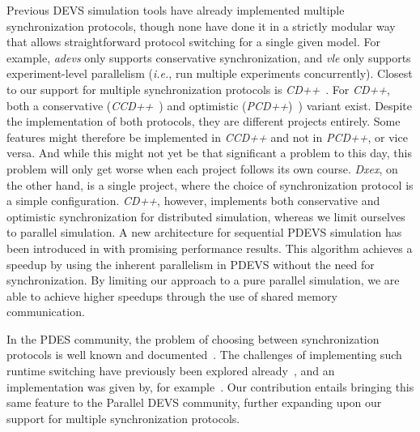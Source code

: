 Previous \textsf{DEVS} simulation tools have already implemented multiple synchronization protocols, though none have done it in a strictly modular way that allows straightforward protocol switching for a single given model.
For example, \textit{adevs} only supports conservative synchronization, and \textit{vle} only supports experiment-level parallelism (\textit{i.e.}, run multiple experiments concurrently).
Closest to our support for multiple synchronization protocols is \textit{CD++}~\cite{CD++}.
For \textit{CD++}, both a conservative (\textit{CCD++}~\cite{CCD++}) and optimistic (\textit{PCD++})~\cite{PCD++}) variant exist.
Despite the implementation of both protocols, they are different projects entirely.
Some features might therefore be implemented in \textit{CCD++} and not in \textit{PCD++}, or vice versa.
And while this might not yet be that significant a problem to this day, this problem will only get worse when each project follows its own course.
\textit{Dxex}, on the other hand, is a single project, where the choice of synchronization protocol is a simple configuration.
\textit{CD++}, however, implements both conservative and optimistic synchronization for distributed simulation, whereas we limit ourselves to parallel simulation. 
A new architecture for sequential PDEVS simulation has been introduced in \cite{SeqPDEVSArch} with promising performance results. This algorithm achieves a speedup by using the inherent parallelism in PDEVS without the need for synchronization.
By limiting our approach to a pure parallel simulation, we are able to achieve higher speedups through the use of shared memory communication. 

In the \textsf{PDES} community, the problem of choosing between synchronization protocols is well known and documented~\cite{Jha:1994:UFC:195291.182480}.
The challenges of implementing such runtime switching have previously been explored already~\cite{Das:1996:APP:256562.256602}, and an implementation was given by, for example~\cite{perumalla2005musik}.
Our contribution entails bringing this same feature to the \textsf{Parallel DEVS} community, further expanding upon our support for multiple synchronization protocols.

